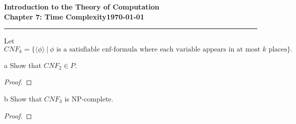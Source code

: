 \documentclass[11pt]{article}
\newcommand{\dated}{\today}
\begin{document}
\textbf{Introduction to the Theory of
Computation}\hfill\textbf{\myname}\\[0.01in]
\textbf{Chapter 7: Time Complexity}\hfill\textbf{\dated}\\
\smallskip\hrule\bigskip

\begin{problem}{7.24}
Let
\[
CNF_k = \{\langle \phi \rangle \ | \ \phi \text{ is a satisfiable cnf-formula where each variable appears in at most } k \text{ places}\}.
\]
\end{problem}

\begin{problem}[Part]{a}
Show that $CNF_2 \in P$.
\end{problem}

\begin{proof}
\end{proof}

\begin{problem}[Part]{b}
Show that $CNF_3$ is NP-complete.
\end{problem}

\begin{proof}
\end{proof}
\end{document}
